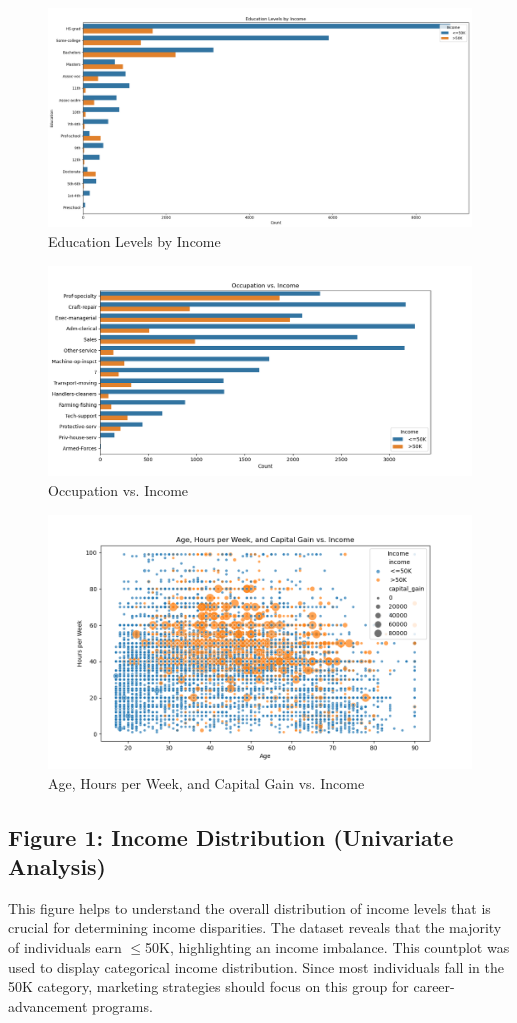 \documentclass[journal,onecolumn]{IEEEtran}
\begin{document}
\begin{figure}[h]
  \centering
  \includegraphics[width=0.5\linewidth]{3_EducationLevelsbyIncome.png}
  \caption{Education Levels by Income}
  \label{fig:education-levels-by-income}
\end{figure}

\begin{figure}[h]
  \centering
  \includegraphics[width=0.5\linewidth]{4_OccupationvsIncome.png}
  \caption{Occupation vs. Income}
  \label{fig:occupation-vs-income}
\end{figure}


\FloatBarrier  %

\begin{figure}[h]
  \centering
  \includegraphics[width=0.5\linewidth]{6_AgeHoursperWeekandCapitalGainvsIncome.png}
  \caption{Age, Hours per Week, and Capital Gain vs. Income}
  \label{fig:age-hoursperweek-and-capitalgain-vs-income}
\end{figure}


\subsection{Figure 1: Income Distribution (Univariate Analysis)}
This figure helps to understand the overall distribution of income levels
that is crucial for determining income disparities. The dataset reveals that 
the majority of individuals earn $\leq$50K, highlighting an income imbalance.
This countplot was used to display categorical income distribution.
Since most individuals fall in the 50K category, marketing strategies
should focus on this group for career-advancement programs.
\end{document}
